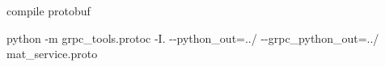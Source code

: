 compile protobuf

{\ttfamily python -\/m grpc\+\_\+tools.\+protoc -\/I. -\/-\/python\+\_\+out=../ -\/-\/grpc\+\_\+python\+\_\+out=../ mat\+\_\+service.\+proto} 